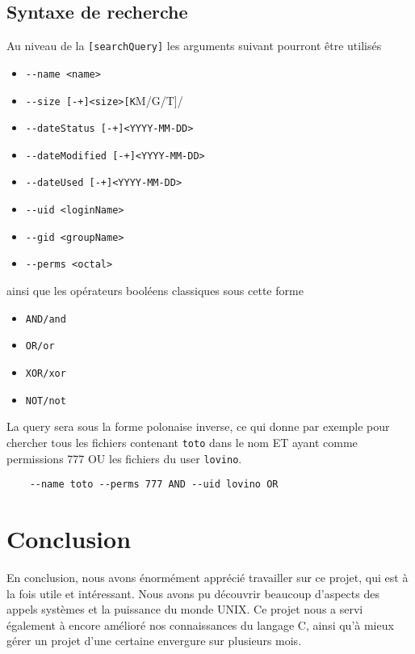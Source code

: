 \documentclass[a4paper]{article}
\begin{document}
\subsection{Syntaxe de recherche}
Au niveau de la \verb+[searchQuery]+ les arguments suivant pourront être utilisés
\begin{itemize}
	\item \verb/--name <name>/
	\item \verb/--size [-+]<size>[K/M/G/T]/
	\item \verb/--dateStatus [-+]<YYYY-MM-DD>/
	\item \verb/--dateModified [-+]<YYYY-MM-DD>/
	\item \verb/--dateUsed [-+]<YYYY-MM-DD>/
	\item \verb/--uid <loginName>/
	\item \verb/--gid <groupName>/
	\item \verb/--perms <octal>/
\end{itemize}
ainsi que les opérateurs booléens classiques sous cette forme
\begin{itemize}
	\item \verb+AND/and+
	\item \verb+OR/or+
	\item \verb+XOR/xor+
	\item \verb+NOT/not+
\end{itemize}
La query sera sous la forme polonaise inverse, ce qui donne par exemple pour chercher tous les fichiers contenant \verb+toto+ dans le nom ET ayant comme permissions 777 OU les fichiers du user \verb+lovino+.
\begin{verbatim}
	--name toto --perms 777 AND --uid lovino OR
\end{verbatim}
\section{Conclusion}
En conclusion, nous avons énormément apprécié travailler sur ce projet, qui est à la fois utile et intéressant. Nous avons pu découvrir beaucoup d'aspects des appels systèmes et la puissance du monde UNIX. Ce projet nous a servi également à encore amélioré nos connaissances du langage C, ainsi qu'à mieux gérer un projet d'une certaine envergure sur plusieurs mois.
\end{document}
